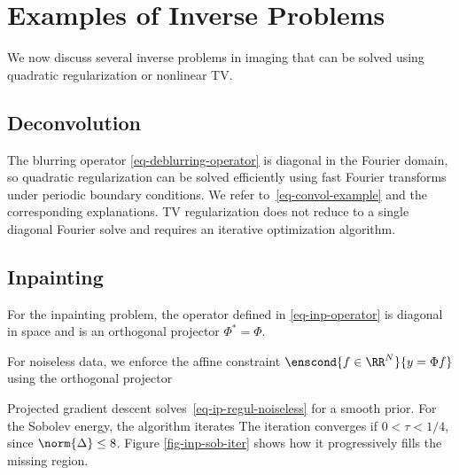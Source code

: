 \section{Examples of Inverse Problems}

We now discuss several inverse problems in imaging that can be solved using quadratic regularization or nonlinear TV.

                                                                
\subsection{Deconvolution}
\label{subsec-deconv}

The blurring operator \eqref{eq-deblurring-operator} is diagonal in the Fourier domain, so quadratic regularization can be solved efficiently using fast Fourier transforms under periodic boundary conditions. We refer to~\eqref{eq-convol-example} and the corresponding explanations. TV regularization does not reduce to a single diagonal Fourier solve and requires an iterative optimization algorithm.


                                                                
\subsection{Inpainting}
\label{sec-inpainting-variational}

For the inpainting problem, the operator defined in \eqref{eq-inp-operator} is diagonal in space
and is an orthogonal projector $\Phi^* = \Phi$.

For noiseless data, we enforce the affine constraint $\enscond{f \in \RR^N}{y=\Phi f}$ using the orthogonal projector


Projected gradient descent solves~\eqref{eq-ip-regul-noiseless} for a smooth prior.
For the Sobolev energy, the algorithm iterates
The iteration converges if $0<\tau<1/4$, since $\norm{\Delta}\leq8$. Figure \ref{fig-inp-sob-iter} shows how it progressively fills the missing region.

                                                                                                         

